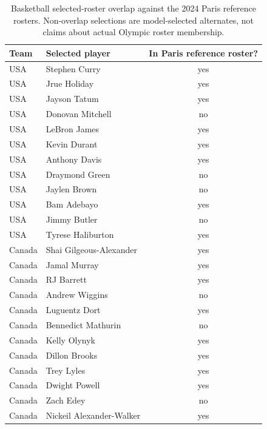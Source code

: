 \documentclass[12pt,letterpaper]{article}
\begin{document}
\begin{table}[h]
  \centering
  \caption{Basketball selected-roster overlap against the 2024 Paris
    reference rosters. Non-overlap selections are model-selected
    alternates, not claims about actual Olympic roster membership.}
  \label{tab:bball-overlap}
  \small
  \begin{tabular}{l l c}
    \toprule
    Team & Selected player & In Paris reference roster? \\
    \midrule
    USA & Stephen Curry       & yes \\
    USA & Jrue Holiday        & yes \\
    USA & Jayson Tatum        & yes \\
    USA & Donovan Mitchell    & no  \\
    USA & LeBron James        & yes \\
    USA & Kevin Durant        & yes \\
    USA & Anthony Davis       & yes \\
    USA & Draymond Green      & no  \\
    USA & Jaylen Brown        & no  \\
    USA & Bam Adebayo         & yes \\
    USA & Jimmy Butler        & no  \\
    USA & Tyrese Haliburton   & yes \\
    Canada & Shai Gilgeous-Alexander  & yes \\
    Canada & Jamal Murray             & yes \\
    Canada & RJ Barrett               & yes \\
    Canada & Andrew Wiggins           & no  \\
    Canada & Luguentz Dort            & yes \\
    Canada & Bennedict Mathurin       & no  \\
    Canada & Kelly Olynyk             & yes \\
    Canada & Dillon Brooks            & yes \\
    Canada & Trey Lyles               & yes \\
    Canada & Dwight Powell            & yes \\
    Canada & Zach Edey                & no  \\
    Canada & Nickeil Alexander-Walker & yes \\
    \bottomrule
  \end{tabular}
\end{table}
\end{document}
